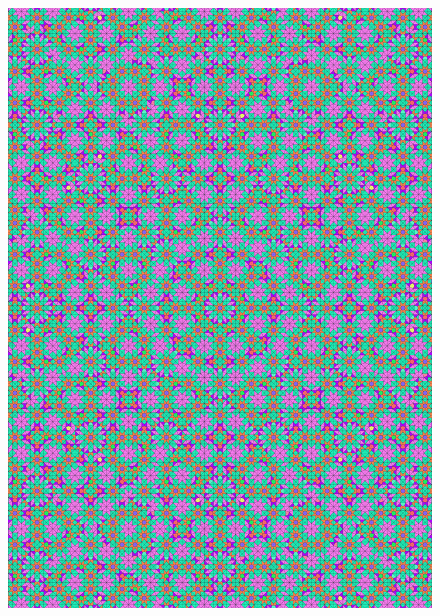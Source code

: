 \documentclass[text.tex]{subfiles}
\begin{document}
\begin{figure}[h!]
\centering
\includegraphics[width=1\textwidth]{img/results/circle8/quasi_circle_209091_(3044_-1260alpha_1).pdf}
\end{figure}
\end{document}
